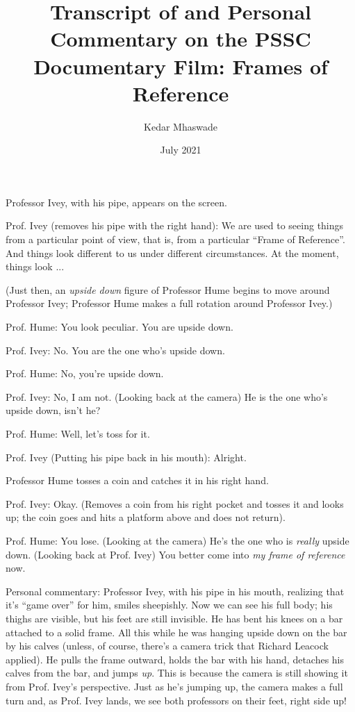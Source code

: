 \documentclass[a6paper]{article}
\begin{document}
\title{Transcript of and Personal Commentary on the PSSC Documentary Film: Frames of Reference}
\date{July 2021}
\author{Kedar Mhaswade}
\maketitle

Professor Ivey, with his pipe, appears on the screen.

Prof. Ivey (removes his pipe with the right hand): We are used to seeing things from a particular point of view, that is, from a particular ``Frame of Reference''. And things look different to us under different circumstances. At the moment, things look ...

(Just then, an \emph{upside down} figure of Professor Hume begins to move around Professor Ivey; Professor Hume makes a full rotation around Professor Ivey.)

Prof. Hume: You look peculiar. You are upside down.

Prof. Ivey: No. You are the one who's upside down.

Prof. Hume: No, you're upside down.

Prof. Ivey: No, I am not. (Looking back at the camera) He is the one who's upside down, isn't he?

Prof. Hume: Well, let's toss for it.

Prof. Ivey (Putting his pipe back in his mouth): Alright.

Professor Hume tosses a coin and catches it in his right hand. 

Prof. Ivey: Okay. (Removes a coin from his right pocket and tosses it and looks up; the coin goes and hits a platform above and does not return).

Prof. Hume: You lose. (Looking at the camera) He's the one who is \emph{really} upside down. (Looking back at Prof. Ivey) You better come into \emph{my frame of reference} now.

Personal commentary: Professor Ivey, with his pipe in his mouth, realizing that it's ``game over'' for him, smiles sheepishly. Now we can see his full body; his thighs are visible, but his feet are still invisible. He has bent his knees on a bar attached to a solid frame. All this while he was hanging upside down on the bar by his calves (unless, of course, there's a camera trick that Richard Leacock applied). He pulls the frame outward, holds the bar with his hand, detaches his calves from the bar, and jumps \emph{up}. This is because the camera is still showing it from Prof. Ivey's perspective. Just as he's jumping up, the camera makes a full turn and, as Prof. Ivey lands, we see both professors on their feet, right side up! 
\end{document}
